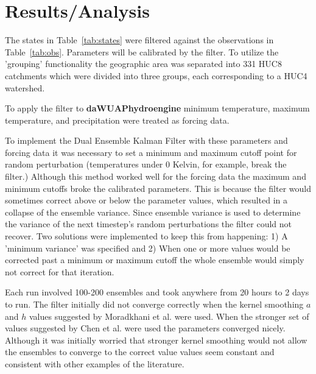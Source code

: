 \chapter{Results/Analysis}

The states in Table~\ref{tab:states} were filtered against the observations in Table~\ref{tab:obs}. Parameters will be calibrated by the filter. To utilize the 'grouping' functionality the geographic area was separated into  331 HUC8 catchments which were divided into three groups, each corresponding to a HUC4 watershed.

To apply the filter to \textbf{daWUAPhydroengine} minimum temperature, maximum temperature, and precipitation were treated as forcing data.

To implement the Dual Ensemble Kalman Filter with these parameters and forcing data it was necessary to set a minimum and maximum cutoff point for random perturbation (temperatures under 0 Kelvin, for example, break the filter.) Although this method worked well  for the forcing data the maximum and minimum cutoffs broke the calibrated parameters. This is because the filter would sometimes correct above or below the parameter values, which resulted in a collapse of the ensemble variance. Since ensemble variance is used to determine the variance of the next timestep's random perturbations the filter could not recover. Two solutions were implemented to keep this from happening: 1) A 'minimum variance' was specified and 2) When one or more values would be corrected past a minimum or maximum cutoff the whole ensemble would simply not correct for that iteration.

Each run involved 100-200 ensembles and took anywhere from 20 hours to 2 days to run. The filter initially did not converge correctly when the kernel smoothing $a$ and $h$ values suggested by Moradkhani et al. were used. When the stronger set of values suggested by Chen et al. \cite{Chen2008} were used the parameters converged nicely. Although it was initially worried that stronger kernel smoothing would not allow the ensembles to converge to the correct value values seem constant and consistent with other examples of the literature.

